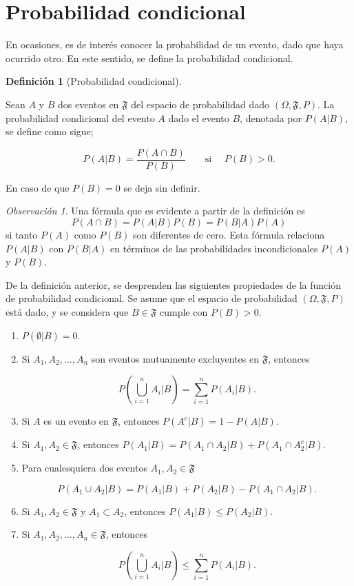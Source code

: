 \documentclass[
  us-letterpaper,
]{scrreprt}
\theoremstyle{plain}
\theoremstyle{definition}
\newtheorem{definition}{Definición}[chapter]
\theoremstyle{definition}
\theoremstyle{plain}
\theoremstyle{remark}
\newtheorem*{remark}{Observación}
\begin{document}
\section{Probabilidad condicional}\label{probabilidad-condicional}

En ocasiones, es de interés conocer la probabilidad de un evento, dado
que haya ocurrido otro. En este sentido, se define la probabilidad
condicional.

\begin{definition}[Probabilidad
condicional]\protect\hypertarget{def-pcond}{}\label{def-pcond}

Sean \(A\) y \(B\) dos eventos en \(\mathfrak{F}\) del espacio de
probabilidad dado \((\Omega, \mathfrak{F}, P)\). La probabilidad
condicional del evento \(A\) dado el evento \(B\), denotada por
\(P(A|B)\), se define como sigue;

\[P(A|B)= \frac{P(A\cap B)}{P(B)}\qquad\text{si }\quad P(B)>0.\]

En caso de que \(P(B)=0\) se deja sin definir.

\end{definition}

\begin{remark}
Una fórmula que es evidente a partir de la definición es
\[P(A\cap B)= P(A|B)P(B)=P(B|A)P(A)\] si tanto \(P(A)\) como \(P(B)\)
son diferentes de cero. Esta fórmula relaciona \(P(A|B)\) con \(P(B|A)\)
en términos de las probabilidades incondicionales \(P(A)\) y \(P(B)\).
\end{remark}

De la definición anterior, se desprenden las siguientes propiedades de
la función de probabilidad condicional. Se asume que el espacio de
probabilidad \((\Omega, \mathfrak{F}, P)\) está dado, y se considera que
\(B\in\mathfrak{F}\) cumple con \(P(B)>0\).

\begin{enumerate}
\def\labelenumi{\roman{enumi}.}
\item
  \(P(\emptyset| B)=0\).
\item
  Si \(A_1, A_2, \ldots, A_n\) son eventos mutuamente excluyentes en
  \(\mathfrak{F}\), entonces

  \[P\left(\bigcup_{i=1}^n A_i|B\right)= \sum_{i=1}^n P(A_i|B).\]
\item
  Si \(A\) es un evento en \(\mathfrak{F}\), entonces
  \(P(A^c| B)=1-P(A|B)\).
\item
  Si \(A_1, A_2\in \mathfrak{F}\), entonces
  \(P(A_1|B)=P(A_1\cap A_2|B)+ P(A_1\cap A_2^c|B)\).
\item
  Para cualesquiera dos eventos \(A_1,A_2\in \mathfrak{F}\)

  \[P(A_1\cup A_2|B)=P(A_1|B)+P(A_2|B)-P(A_1\cap A_2|B).\]
\item
  Si \(A_1, A_2\in\mathfrak{F}\) y \(A_1\subset A_2\), entonces
  \(P(A_1|B)\leq P(A_2|B)\).
\item
  Si \(A_1, A_2,\ldots, A_n\in\mathfrak{F}\), entonces

  \[P\left(\bigcup_{i=1}^n A_i|B\right)\leq \sum_{i=1}^n P(A_i|B).\]
\end{enumerate}
\end{document}
